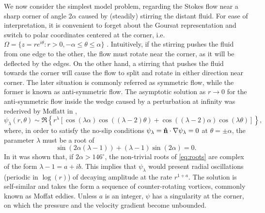 We now consider the simplest model problem, regarding the Stokes flow near a sharp corner of angle $2\alpha$ caused by (steadily) stirring the distant fluid. For ease of interpretation, it is convenient to forget about the Goursat representation and switch to polar coordinates centered at the corner, i.e. $\Omega = \{z = re^{i\theta} : r > 0, -\alpha \leq \theta \leq \alpha \}$ . Intuitively, if the stirring pushes the fluid from one edge to the other, the flow must rotate near the corner, as it will be deflected by the edges. On the other hand, a stirring that pushes the fluid towards the corner will cause the flow to split and rotate in either direction near corner. The later situation is commonly referred as symmetric flow, while the former is known as anti-symmetric flow. The asymptotic solution as $r\to 0$ for the anti-symmetric flow inside the wedge caused by a perturbation at infinity was rederived by Moffatt in \cite{moffatt64},
\begin{equation}
\psi_\lambda(r,\theta) \sim \Re\left\{r^\lambda \left[\cos{(\lambda\alpha)}\cos{\left((\lambda-2)\theta\right)}+\cos{\left((\lambda-2)\alpha\right)}\cos{(\lambda\theta)}\right]\right\},
\end{equation}
where, in order to satisfy the no-slip conditions $\psi_\lambda=\mathbf{\hat{n}}\cdot\nabla\psi_\lambda=0$ at $\theta=\pm\alpha$, the parameter $\lambda$ must be a root of
\begin{equation}\label{eq:roots}
\sin{\left(2\alpha(\lambda-1)\right)} + (\lambda-1)\sin{(2\alpha)}=0.
\end{equation}
In \cite{dean49} it was shown that, if $2\alpha>146^\circ$, the non-trivial roots of \eqref{eq:roots} are complex of the form $\lambda-1=a + ib$. This implies that $\psi_\lambda$ would present radial oscillations (periodic in $\log(r)$) of decaying amplitude at the rate  $r^{1+a}$. The solution is self-similar and takes the form a sequence of counter-rotating vortices, commonly known as Moffat eddies. Unless $a$ is an integer, $\psi$ has a singularity at the corner, on which the pressure and the velocity gradient become unbounded.

